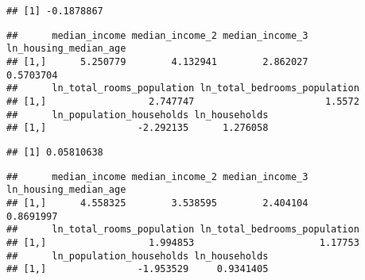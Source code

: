 \documentclass[
]{article}
\newenvironment{Shaded}{\begin{snugshade}}{\end{snugshade}}
\newcommand{\DecValTok}[1]{\textcolor[rgb]{0.00,0.00,0.81}{#1}}
\newcommand{\KeywordTok}[1]{\textcolor[rgb]{0.13,0.29,0.53}{\textbf{#1}}}
\newcommand{\NormalTok}[1]{#1}
\newcommand{\OperatorTok}[1]{\textcolor[rgb]{0.81,0.36,0.00}{\textbf{#1}}}
\newcommand{\StringTok}[1]{\textcolor[rgb]{0.31,0.60,0.02}{#1}}
\begin{document}
\begin{Shaded}
\end{Shaded}

\begin{verbatim}
## [1] -0.1878867
\end{verbatim}

\begin{Shaded}
\end{Shaded}

\begin{verbatim}
##      median_income median_income_2 median_income_3 ln_housing_median_age
## [1,]      5.250779        4.132941        2.862027             0.5703704
##      ln_total_rooms_population ln_total_bedrooms_population
## [1,]                  2.747747                       1.5572
##      ln_population_households ln_households
## [1,]                -2.292135      1.276058
\end{verbatim}

\begin{Shaded}
\end{Shaded}

\begin{verbatim}
## [1] 0.05810638
\end{verbatim}

\begin{Shaded}
\end{Shaded}

\begin{verbatim}
##      median_income median_income_2 median_income_3 ln_housing_median_age
## [1,]      4.558325        3.538595        2.404104             0.8691997
##      ln_total_rooms_population ln_total_bedrooms_population
## [1,]                  1.994853                      1.17753
##      ln_population_households ln_households
## [1,]                -1.953529     0.9341405
\end{verbatim}
\end{document}
